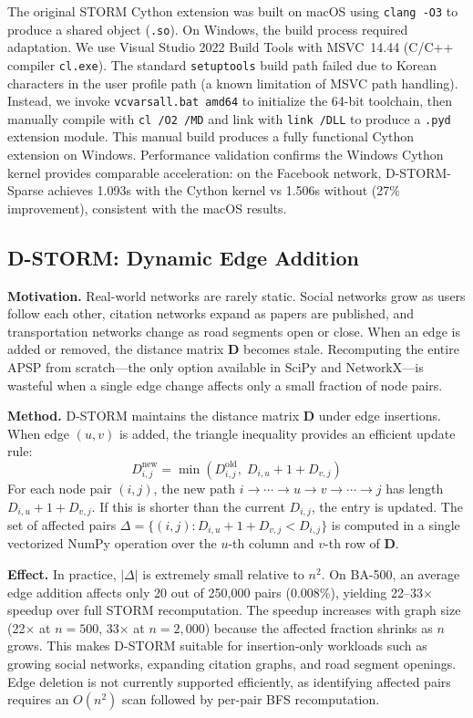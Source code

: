 \documentclass[journal]{IEEEtran}
\begin{document}
The original STORM Cython extension was built on macOS using \texttt{clang -O3} to produce a shared object (\texttt{.so}). On Windows, the build process required adaptation. We use Visual Studio 2022 Build Tools with MSVC~14.44 (C/C++ compiler \texttt{cl.exe}). The standard \texttt{setuptools} build path failed due to Korean characters in the user profile path (a known limitation of MSVC path handling). Instead, we invoke \texttt{vcvarsall.bat amd64} to initialize the 64-bit toolchain, then manually compile with \texttt{cl /O2 /MD} and link with \texttt{link /DLL} to produce a \texttt{.pyd} extension module. This manual build produces a fully functional Cython extension on Windows. Performance validation confirms the Windows Cython kernel provides comparable acceleration: on the Facebook network, D-STORM-Sparse achieves 1.093s with the Cython kernel vs 1.506s without (27\% improvement), consistent with the macOS results.

\subsection{D-STORM: Dynamic Edge Addition}

\textbf{Motivation.} Real-world networks are rarely static. Social networks grow as users follow each other, citation networks expand as papers are published, and transportation networks change as road segments open or close. When an edge is added or removed, the distance matrix $\mathbf{D}$ becomes stale. Recomputing the entire APSP from scratch---the only option available in SciPy and NetworkX---is wasteful when a single edge change affects only a small fraction of node pairs.

\textbf{Method.} D-STORM maintains the distance matrix $\mathbf{D}$ under edge insertions. When edge $(u,v)$ is added, the triangle inequality provides an efficient update rule:
\begin{equation}
  D_{i,j}^{\text{new}} = \min\left(D_{i,j}^{\text{old}},\; D_{i,u} + 1 + D_{v,j}\right)
\end{equation}
For each node pair $(i,j)$, the new path $i \rightarrow \cdots \rightarrow u \rightarrow v \rightarrow \cdots \rightarrow j$ has length $D_{i,u} + 1 + D_{v,j}$. If this is shorter than the current $D_{i,j}$, the entry is updated. The set of affected pairs $\Delta = \{(i,j) : D_{i,u}+1+D_{v,j} < D_{i,j}\}$ is computed in a single vectorized NumPy operation over the $u$-th column and $v$-th row of $\mathbf{D}$.

\textbf{Effect.} In practice, $|\Delta|$ is extremely small relative to $n^2$. On BA-500, an average edge addition affects only 20 out of 250{,}000 pairs (0.008\%), yielding 22--33$\times$ speedup over full STORM recomputation. The speedup increases with graph size (22$\times$ at $n=500$, 33$\times$ at $n=2{,}000$) because the affected fraction shrinks as $n$ grows. This makes D-STORM suitable for insertion-only workloads such as growing social networks, expanding citation graphs, and road segment openings. Edge deletion is not currently supported efficiently, as identifying affected pairs requires an $O(n^2)$ scan followed by per-pair BFS recomputation.
\end{document}
